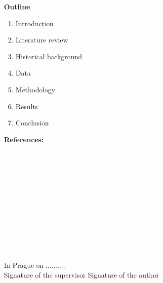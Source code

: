 \noindent \large{\bf  Outline}
\begin{enumerate}
\item Introduction
 \item Literature review 
 \item Historical background
 \item Data
 \item Methodology
 \item Results
 \item Conclusion 
\end{enumerate}
\medskip
\large{\bf References:}\\
 \\
 \\
 \\
 \\
 \\
 \\
 \\
 \\
 \\
 \\
\\
\vspace{15mm}\\
In Prague on ..........\newline \\
Signature of the supervisor \hspace{30mm} Signature of the author
